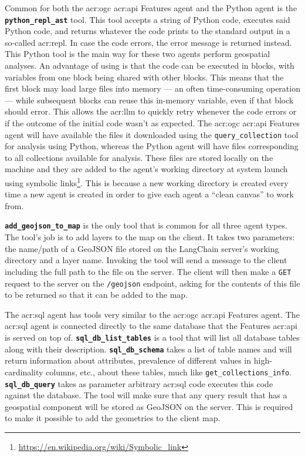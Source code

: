 Common for both the \acrshort{acr:ogc} \acrshort{acr:api} Features agent and the Python agent is the \textbf{\texttt{python\_repl\_ast}} tool. This tool accepts a string of Python code, executes said Python code, and returns whatever the code prints to the standard output in a so-called \acrfull{acr:repl}. In case the code errors, the error message is returned instead. This Python tool is the main way for these two agents perform geospatial analyses. An advantage of using  is that the code can be executed in blocks, with variables from one block being shared with other blocks. This means that the first block may load large files into memory --- an often time-consuming operation --- while subsequent blocks can reuse this in-memory variable, even if that block should error. This allows the \acrshort{acr:llm} to quickly retry whenever the code errors or if the outcome of the initial code wasn't as expected. The \acrshort{acr:ogc} \acrshort{acr:api} Features agent will have available the files it downloaded using the \texttt{query\_collection} tool for analysis using Python, whereas the Python agent will have files corresponding to all collections available for analysis. These files are stored locally on the machine and they are added to the agent's working directory at system launch using symbolic links\footnote{\url{https://en.wikipedia.org/wiki/Symbolic_link}}. This is because a new working directory is created every time a new agent is created in order to give each agent a \enquote{clean canvas} to work from.

\textbf{\texttt{add\_geojson\_to\_map}} is the only tool that is common for all three agent types. The tool's job is to add layers to the map on the client. It takes two parameters: the name/path of a GeoJSON file stored on the LangChain server's working directory and a layer name. Invoking the tool will send a message to the client including the full path to the file on the server. The client will then make a \texttt{GET} request to the server on the \texttt{/geojson} endpoint, asking for the contents of this file to be returned so that it can be added to the map.

The \acrshort{acr:sql} agent has tools very similar to the \acrshort{acr:ogc} \acrshort{acr:api} Features agent. The \acrshort{acr:sql} agent is connected directly to the same database that the Features \acrshort{acr:api} is served on top of. \textbf{\texttt{sql\_db\_list\_tables}} is a tool that will list all database tables along with their description. \textbf{\texttt{sql\_db\_schema}} takes a list of table names and will return information about attributes, prevalence of different values in high-cardinality columns, etc., about these tables, much like \texttt{get\_collections\_info}. \textbf{\texttt{sql\_db\_query}} takes as parameter arbitrary \acrshort{acr:sql} code executes this code against the database. The tool will make sure that any query result that has a geospatial component will be stored as GeoJSON on the server. This is required to make it possible to add the geometries to the client map.


